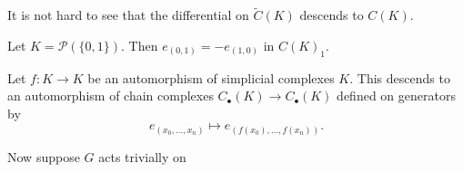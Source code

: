\documentclass[main.tex]{subfiles}
\begin{document}
It is not hard to see that the differential on $\widetilde{C}(K)$ descends to $C(K)$.

\begin{example}
  Let $K = \mathcal{P}(\{0, 1\})$. Then $e_{(0, 1)} = -e_{(1, 0)}$ in $C(K)_{1}$.
\end{example}

Let $f\colon K \to K$ be an automorphism of simplicial complexes $K$. This descends to an automorphism of chain complexes $C_{\bullet}(K) \to C_{\bullet}(K)$ defined on generators by
\begin{equation*}
  e_{(x_{0}, \ldots, x_{n})} \mapsto e_{(f(x_{0}), \ldots, f(x_{n}))}.
\end{equation*}

Now suppose $G$ acts trivially on
\end{document}
